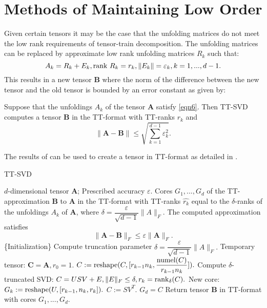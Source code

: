 \section{Methods of Maintaining Low Order}
Given certain tensors it may be the case that the unfolding matrices do not meet the low rank requirements of tensor-train decomposition. The unfolding matrices can be replaced by approximate low rank unfolding matrices $R_k$ such that:
\begin{equation}\label{eqn6}
A_k = R_k + E_k,\textnormal{rank } R_k = r_k, \| E_k \| = \varepsilon_k, k = 1,...,d-1.
\end{equation}
This results in a new tensor \textbf{B} where the norm of the difference between the new tensor and the old tensor is bounded by an error constant as given by:
\begin{theorem}\label{ttaprox}
Suppose that the unfoldings $A_k$ of the tensor \textbf{A} satisfy \ref{eqn6}. Then TT-SVD computes a tensor \textbf{B} in the TT-format with TT-ranks $r_k$ and
\begin{equation*}
\| \textbf{A}-\textbf{B}\| \leq \sqrt{\sum_{k=1}^{d-1}\varepsilon_k^2}.
\end{equation*}    
\end{theorem}
The results of  can be used to create a tensor in TT-format as detailed in .

\begin{algorithm}
\caption{TT-SVD \cite{Osel1}}\label{ttsvd}
\begin{algorithmic}[1]
	\Require $d$-dimensional tensor \textbf{A}; Prescribed accuracy $\varepsilon$.
	\Ensure Cores $G_1,...,G_d$ of the TT-approximation \textbf{B} to \textbf{A} in the TT-format with TT-ranks $\hat{r_k}$ equal to the $\delta$-ranks of the unfoldings $A_k$ of \textbf{A}, where $\delta = \dfrac{\varepsilon}{\sqrt{d-1}}\|A\|_F.$
	\Statex The computed approximation satisfies
	\begin{equation*}
	\| \textbf{A}-\textbf{B}\|_F \leq \varepsilon\|\textbf{A}\|_F.
	\end{equation*} 
	\State \{Initialization\}
	\Statex	Compute truncation parameter $\delta = \dfrac{\varepsilon}{\sqrt{d-1}}\|A\|_F.$ 
	\State Temporary tensor: $\textbf{C}=\textbf{A}, r_0 = 1.$
	 \do{}
		\State $C:= \textnormal{reshape} (C,[r_{k-1}n_k,\dfrac{\textnormal{numel}(C)}{r_{k-1}n_k}]).$
		\State Compute $\delta$-truncated SVD: $C = USV + E, \|E\|_F \leq \delta, r_k = \textnormal{rank}_\delta(C).$
		\State New core: $G_k := \textnormal{reshape}(U,[r_{k-1},n_k,r_k]).$
		\State $C:=SV^T.$
	\EndFor
	\State $G_d =C$
	\State Return tensor \textbf{B} in TT-format with cores $G_1,...,G_d$.
\end{algorithmic}
\end{algorithm}

